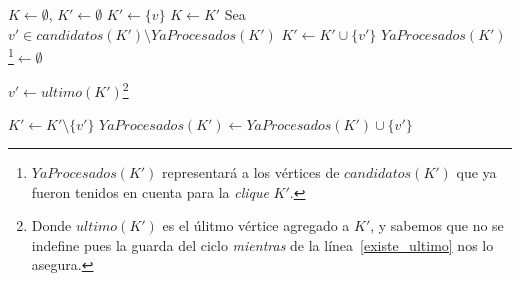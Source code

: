 \begin{pseudocodigo}
        \State $K \gets \emptyset$, $K' \gets \emptyset$
            \State $K' \gets \{v\}$
            \label{existe_ultimo}
                    \State $K \gets K'$
                    \State Sea $v' \in candidatos(K') \setminus YaProcesados(K')$
                    \State $K' \gets K' \cup \{v'\}$
                    \State $YaProcesados(K')$\footnote{$YaProcesados(K')$ representar\'a a
                        los v\'ertices de $candidatos(K')$ que ya fueron tenidos en cuenta
                        para la \emph{clique} $K'$.}$ \gets \emptyset$

                \Else {}
                    \State $v' \gets ultimo(K')$\footnote{Donde $ultimo(K')$
                        es el \'ulitmo v\'ertice agregado a $K'$, y sabemos que no se
                        indefine pues la guarda del ciclo \emph{mientras} de la
                        l\'inea~\ref{existe_ultimo} nos lo asegura.}

                    \State $K' \gets K' \setminus \{v'\}$
                    \State $YaProcesados(K') \gets YaProcesados(K') \cup \{v'\}$

                \EndIf
            \EndWhile
        \EndFor
    \EndIf

    \State {}
\end{pseudocodigo}

